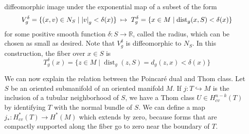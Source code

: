 diffeomorphic image under the exponential map of a subset of the form
\begin{equation} \label{eq:tubular_radius}
	V^\delta_g = \set[*]{(x,v)\in N_S \mid \abs{v}_g < \delta(x)}
	\;\mapsto\; 
	T^\delta_g = \set{x \in M \mid \operatorname{dist}_g(x,S) < \delta(x)}
\end{equation}
for some positive smooth function $\delta : S \to \mathbb{R}$, called the
radius, which can be chosen as small as desired. Note that $V^\delta_g$ is 
diffeomorphic to  $N_S$. In this construction, the fiber over $x\in S$ is
\begin{equation} \label{eq:tubular_fiber}
		T^\delta_g(x) = \{z \in M \mid \operatorname{dist}_g(z,S) 
		= d_g(z,x) < \delta(x)\}
\end{equation}

We can now explain the relation between the Poincar\'e dual and Thom class.
Let $S$ be an oriented submanifold of an oriented manifold $M$. 
If $j:T \hookrightarrow M$ is the inclusion of a tubular 
neighborhood of $S$, we have a Thom class $U \in H^{n-k}_{cv}(T)$ by identifying 
$T$ with the normal bundle of $S$. 
We can define a map $j_*:H_{cv}^{*}(T) \to H^*(M)$ which extends by zero,
because forms that are compactly supported along the fiber go to zero near 
the boundary of $T$. 

